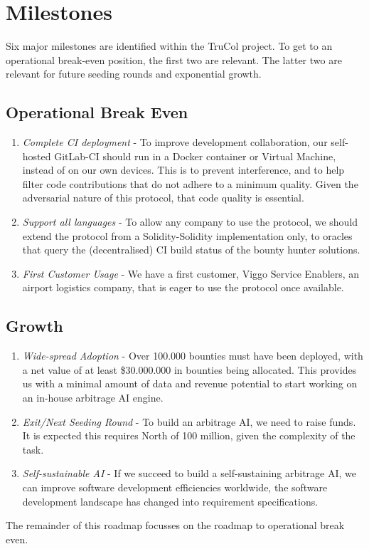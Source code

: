 \section{Milestones}
Six major milestones are identified within the TruCol project. To get to an operational break-even position, the first two are relevant. The latter two are relevant for future seeding rounds and exponential growth.

\subsection{Operational Break Even}
\begin{enumerate}
    \item \textit{Complete CI deployment} - To improve development collaboration, our self-hosted GitLab-CI should run in a Docker container or Virtual Machine, instead of on our own devices. This is to prevent interference, and to help filter code contributions that do not adhere to a minimum quality. Given the adversarial nature of this protocol, that code quality is essential.
    \item  \textit{Support all languages} - To allow any company to use the protocol, we should extend the protocol from a Solidity-Solidity implementation only, to oracles that query the (decentralised) CI build status of the bounty hunter solutions.
    \item \textit{First Customer Usage} - We have a first customer, Viggo Service Enablers, an airport logistics company, that is eager to use the protocol once available.
\end{enumerate}

\subsection{Growth}
\begin{enumerate}
    \item \textit{Wide-spread Adoption} - Over 100.000 bounties must have been deployed, with a net value of at least \$30.000.000 in bounties being allocated. This provides us with a minimal amount of data and revenue potential to start working on an in-house arbitrage AI engine.
    \item  \textit{Exit/Next Seeding Round} - To build an arbitrage AI, we need to raise funds. It is expected this requires North of 100 million, given the complexity of the task.
    \item \textit{Self-sustainable AI} - If we succeed to build a self-sustaining arbitrage AI, we can improve software development efficiencies worldwide, the software development landscape has changed into requirement specifications.
\end{enumerate}

\noindent The remainder of this roadmap focusses on the roadmap to operational break even.
